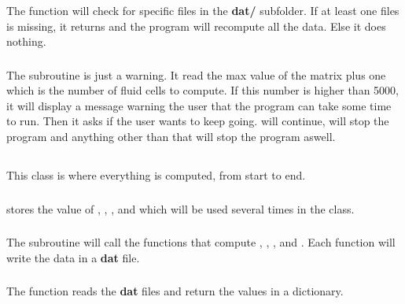 \subsubsection{\textcolor{func}{}}
The function \textcolor{func}{} will check for specific
files in the \textbf{dat/} subfolder. If at least one files is missing, it
returns  and the program will recompute all the data. Else it does
nothing.

\subsubsection{\textcolor{func}{}}
The subroutine \textcolor{func}{} is just a warning. It read the max value of
the matrix  plus one which is the number of fluid cells to compute.
If this number is higher than 5000, it will display a message warning the user
that the program can take some time to run. Then it asks if the user wants to
keep going.  will continue,  will stop the program and
anything other than that will stop the program aswell.

\subsection{}
This class is where everything is computed, from start to end.

\subsubsection{\textcolor{func}{}}
\textcolor{func}{} stores the value of , , ,  and
 which will be used several times in the class.

\subsubsection{\textcolor{func}{}}
The subroutine \textcolor{func}{} will call the functions that compute ,
, ,  and . Each function
will write the data in a \textbf{dat} file.

\subsubsection{\textcolor{func}{}}
The function \textcolor{func}{} reads the \textbf{dat} files and return the
values in a dictionary.

